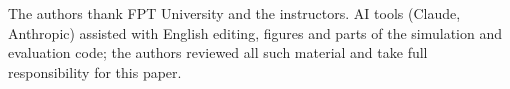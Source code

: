 \documentclass[sigconf,screen]{acmart}
\begin{document}
\begin{acks}
The authors thank FPT University and the instructors. AI tools (Claude, Anthropic) assisted with English editing,
figures and parts of the simulation and evaluation code; the authors reviewed all such material and take full
responsibility for this paper.
\end{acks}



\end{document}
